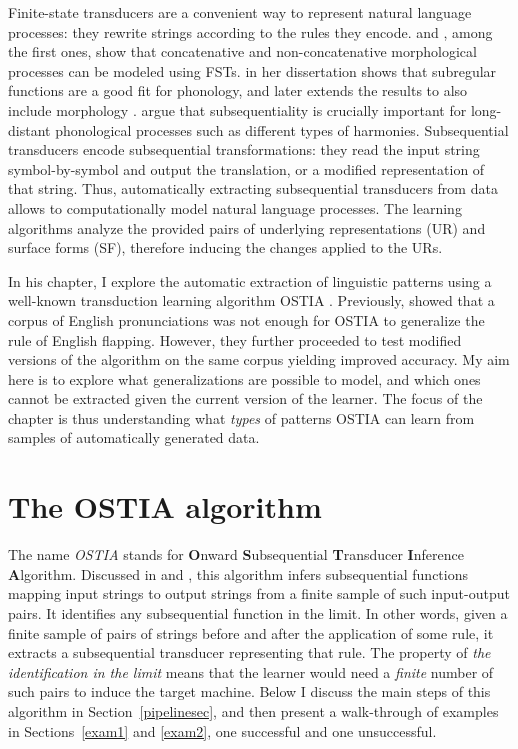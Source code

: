 Finite-state transducers are a convenient way to represent natural language processes: they rewrite strings according to the rules they encode.
\cite{Koskenniemi1983} and \cite{Kiraz1996}, among the first ones, show that concatenative and non-concatenative morphological processes can be modeled using FSTs.
\cite{Chandlee2014} in her dissertation shows that subregular functions are a good fit for phonology, and later extends the results to also include morphology \citep{Chandlee2017}.
\cite{Heinz-Lai-2013-VHS} argue that subsequentiality is crucially important for long-distant phonological processes such as different types of harmonies.
Subsequential transducers encode subsequential transformations: they read the input string symbol-by-symbol and output the translation, or a modified representation of that string.
Thus, automatically extracting subsequential transducers from data allows to computationally model natural language processes.
The learning algorithms analyze the provided pairs of underlying representations (UR) and surface forms (SF), therefore inducing the changes applied to the URs.

In his chapter, I explore the automatic extraction of linguistic patterns using a well-known transduction learning algorithm OSTIA \citep{OncinaEtAl1993}.
Previously, \cite{GildeaJurafsky1996} showed that a corpus of English pronunciations was not enough for OSTIA to generalize the rule of English flapping.
However, they further proceeded to test modified versions of the algorithm on the same corpus yielding improved accuracy.
My aim here is to explore what generalizations are possible to model, and which ones cannot be extracted given the current version of the learner.
The focus of the chapter is thus understanding what \emph{types} of patterns OSTIA can learn from samples of automatically generated data.


\section{The OSTIA algorithm}

The name \emph{OSTIA} stands for \textbf{O}nward  \textbf{S}ubsequential \textbf{T}ransducer \textbf{I}nference \textbf{A}lgorithm.
Discussed in \cite{OncinaEtAl1993} and \cite{DeLaHiguera2010}, this algorithm infers subsequential functions mapping input strings to output strings from a finite sample of such input-output pairs.
It identifies any subsequential function in the limit.
In other words, given a finite sample of pairs of strings before and after the application of some rule, it extracts a subsequential transducer representing that rule.
The property of \emph{the identification in the limit} means that the learner would need a \emph{finite} number of such pairs to induce the target machine.
Below I discuss the main steps of this algorithm in Section~\ref{pipelinesec}, and then present a walk-through of examples in Sections~\ref{exam1} and \ref{exam2}, one successful and one unsuccessful.

